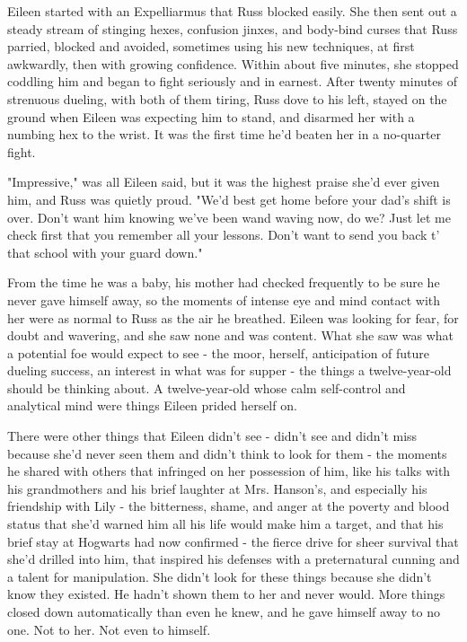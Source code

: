\documentclass[a4paper,11pt]{article}
\begin{document}
Eileen started with an Expelliarmus that Russ blocked easily. She then sent out a steady stream of stinging hexes, confusion jinxes, and body-bind curses that Russ parried, blocked and avoided, sometimes using his new techniques, at first awkwardly, then with growing confidence. Within about five minutes, she stopped coddling him and began to fight seriously and in earnest. After twenty minutes of strenuous dueling, with both of them tiring, Russ dove to his left, stayed on the ground when Eileen was expecting him to stand, and disarmed her with a numbing hex to the wrist. It was the first time he'd beaten her in a no-quarter fight.

"Impressive," was all Eileen said, but it was the highest praise she'd ever given him, and Russ was quietly proud. "We'd best get home before your dad's shift is over. Don't want him knowing we've been wand waving now, do we? Just let me check first that you remember all your lessons. Don't want to send you back t' that school with your guard down."

From the time he was a baby, his mother had checked frequently to be sure he never gave himself away, so the moments of intense eye and mind contact with her were as normal to Russ as the air he breathed. Eileen was looking for fear, for doubt and wavering, and she saw none and was content. What she saw was what a potential foe would expect to see - the moor, herself, anticipation of future dueling success, an interest in what was for supper - the things a twelve-year-old should be thinking about. A twelve-year-old whose calm self-control and analytical mind were things Eileen prided herself on.

There were other things that Eileen didn't see - didn't see and didn't miss because she'd never seen them and didn't think to look for them - the moments he shared with others that infringed on her possession of him, like his talks with his grandmothers and his brief laughter at Mrs. Hanson's, and especially his friendship with Lily - the bitterness, shame, and anger at the poverty and blood status that she'd warned him all his life would make him a target, and that his brief stay at Hogwarts had now confirmed - the fierce drive for sheer survival that she'd drilled into him, that inspired his defenses with a preternatural cunning and a talent for manipulation. She didn't look for these things because she didn't know they existed. He hadn't shown them to her and never would. More things closed down automatically than even he knew, and he gave himself away to no one. Not to her. Not even to himself.
\end{document}

